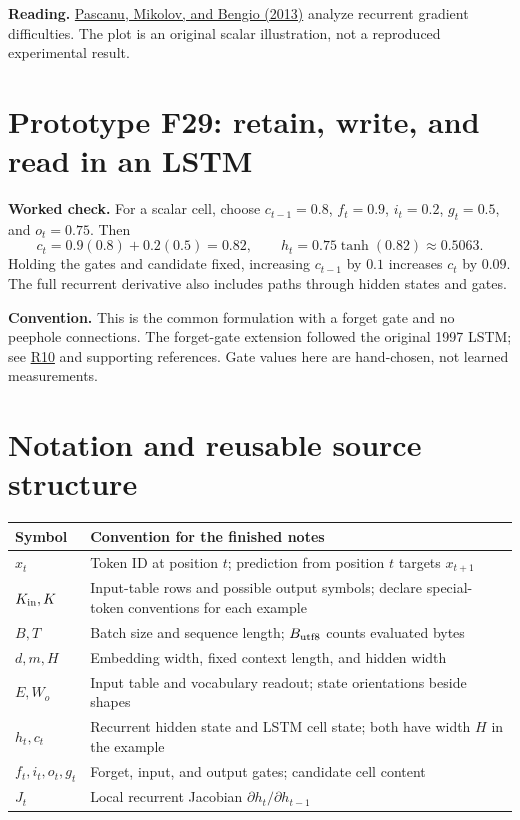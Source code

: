 \documentclass[11pt,a4paper]{article}
\newcommand{\readingref}[1]{\hyperlink{reading:#1}{#1}}
\begin{document}
{\small\color{muted}\textbf{Reading.}
\href{https://proceedings.mlr.press/v28/pascanu13.html}{Pascanu, Mikolov, and Bengio (2013)}
analyze recurrent gradient difficulties. The plot is an original scalar
illustration, not a reproduced experimental result.}

\section{Prototype F29: retain, write, and read in an LSTM}
\begin{center}

\end{center}
\textbf{Worked check.} For a scalar cell, choose $c_{t-1}=0.8$,
$f_t=0.9$, $i_t=0.2$, $g_t=0.5$, and $o_t=0.75$. Then
\[
c_t=0.9(0.8)+0.2(0.5)=0.82,\qquad h_t=0.75\tanh(0.82)\approx0.5063.
\]
Holding the gates and candidate fixed, increasing $c_{t-1}$ by $0.1$
increases $c_t$ by $0.09$. The full recurrent derivative also includes
paths through hidden states and gates.

{\small\color{muted}\textbf{Convention.} This is the common formulation
with a forget gate and no peephole connections. The forget-gate extension
followed the original 1997 LSTM; see \readingref{R10} and supporting references. Gate values here
are hand-chosen, not learned measurements.}

\clearpage
\section{Notation and reusable source structure}
\begin{tabularx}{\textwidth}{@{}l Y@{}}
\toprule
Symbol & Convention for the finished notes\\
\midrule
$x_t$ & Token ID at position $t$; prediction from position $t$ targets $x_{t+1}$\\
$K_{\rm in},K$ & Input-table rows and possible output symbols; declare special-token conventions for each example\\
$B,T$ & Batch size and sequence length; $B_{\rm utf8}$ counts evaluated bytes\\
$d,m,H$ & Embedding width, fixed context length, and hidden width\\
$E,W_o$ & Input table and vocabulary readout; state orientations beside shapes\\
$h_t,c_t$ & Recurrent hidden state and LSTM cell state; both have width $H$ in the example\\
$f_t,i_t,o_t,g_t$ & Forget, input, and output gates; candidate cell content\\
$J_t$ & Local recurrent Jacobian $\partial h_t/\partial h_{t-1}$\\
\bottomrule
\end{tabularx}
\end{document}
